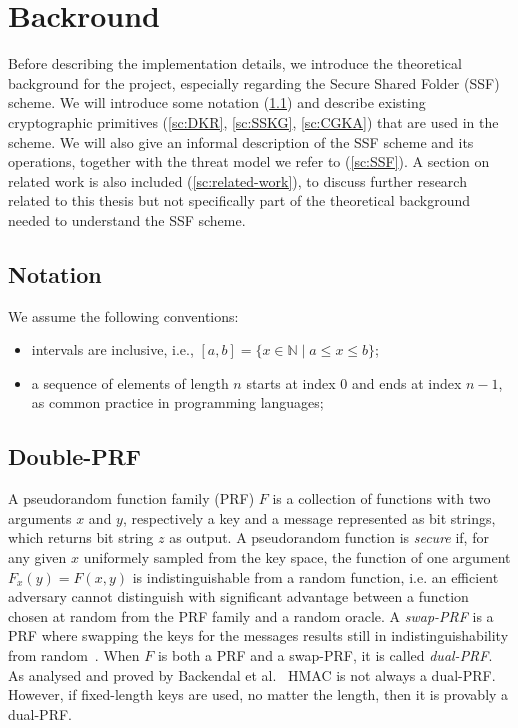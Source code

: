 \chapter{Backround}\label{ch:background}

Before describing the implementation details, we introduce the theoretical
background for the project, especially regarding the Secure Shared Folder 
(SSF) scheme. We will introduce some notation (\cref{sc:notation}) and
describe existing cryptographic primitives (\cref{sc:DKR}, \cref{sc:SSKG}, \cref{sc:CGKA})
that are used in the scheme.
We will also give an informal description of the SSF scheme and its operations,
together with the threat model we refer to (\cref{sc:SSF}).
A section on related work is also included (\cref{sc:related-work}), to discuss further 
research related to this thesis but not specifically 
part of the theoretical background needed to understand the SSF scheme.

\section{Notation}\label{sc:notation}

We assume the following conventions:
\begin{itemize}
    \item intervals are inclusive, i.e., $[a, b] = \{x \in \mathbb{N} \mid a \leq x \leq b\}$;
    \item a sequence of elements of length $n$ starts at index $0$ and ends at index $n-1$, as common practice in programming languages;
\end{itemize}


\section{Double-PRF}\label{sc:DPRF}

A pseudorandom function family (PRF) $F$ is a collection of functions
with two arguments $x$ and $y$, respectively a key and a message
represented as bit strings, which returns bit string $z$ as output.
A pseudorandom function is \textit{secure} if, for any given $x$
uniformely sampled from the key space, the function of one argument
$F_x(y) = F(x, y)$ is indistinguishable from a random function, i.e.
an efficient adversary cannot distinguish with significant advantage
between a function chosen at random from the PRF family and a random oracle.
A \textit{swap-PRF} is a PRF where swapping the keys for the messages
results still in indistinguishability from random~\cite{EPRINT:BelLys15}.
When $F$ is both a PRF and a swap-PRF, it is called \textit{dual-PRF}.
As analysed and proved by Backendal et al.~\cite{C:BBGS23} HMAC is not always a
dual-PRF. However, if fixed-length keys are used, no matter the length,
then it is provably a dual-PRF.

